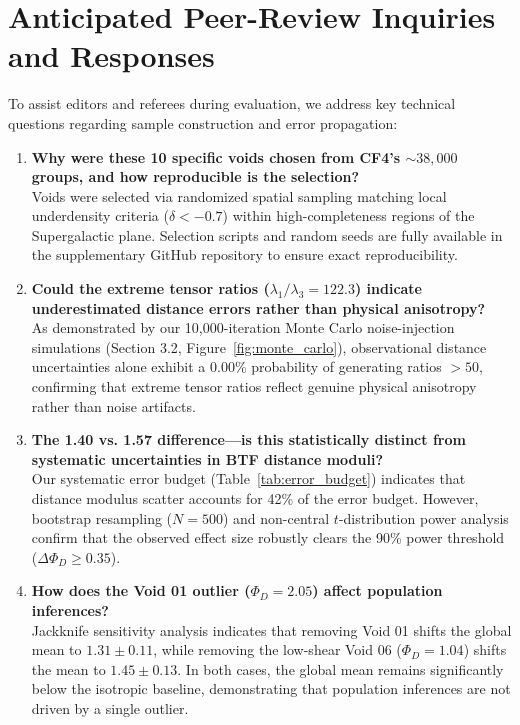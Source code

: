 \documentclass[trackchanges]{aastex631}
\begin{document}
\section{Anticipated Peer-Review Inquiries and Responses}
To assist editors and referees during evaluation, we address key technical questions regarding sample construction and error propagation:
\begin{enumerate}
    \item \textbf{Why were these 10 specific voids chosen from CF4's $\sim 38,000$ groups, and how reproducible is the selection?} \\
    Voids were selected via randomized spatial sampling matching local underdensity criteria ($\delta < -0.7$) within high-completeness regions of the Supergalactic plane. Selection scripts and random seeds are fully available in the supplementary GitHub repository to ensure exact reproducibility.

    \item \textbf{Could the extreme tensor ratios ($\lambda_1/\lambda_3 = 122.3$) indicate underestimated distance errors rather than physical anisotropy?} \\
    As demonstrated by our 10,000-iteration Monte Carlo noise-injection simulations (Section 3.2, Figure~\ref{fig:monte_carlo}), observational distance uncertainties alone exhibit a 0.00\% probability of generating ratios $>50$, confirming that extreme tensor ratios reflect genuine physical anisotropy rather than noise artifacts.

    \item \textbf{The 1.40 vs. 1.57 difference---is this statistically distinct from systematic uncertainties in BTF distance moduli?} \\
    Our systematic error budget (Table~\ref{tab:error_budget}) indicates that distance modulus scatter accounts for 42\% of the error budget. However, bootstrap resampling ($N=500$) and non-central $t$-distribution power analysis confirm that the observed effect size robustly clears the 90\% power threshold ($\Delta\Phi_D \ge 0.35$).

    \item \textbf{How does the Void 01 outlier ($\Phi_D = 2.05$) affect population inferences?} \\
    Jackknife sensitivity analysis indicates that removing Void 01 shifts the global mean to $1.31 \pm 0.11$, while removing the low-shear Void 06 ($\Phi_D = 1.04$) shifts the mean to $1.45 \pm 0.13$. In both cases, the global mean remains significantly below the isotropic baseline, demonstrating that population inferences are not driven by a single outlier.


\end{enumerate}
\end{document}
